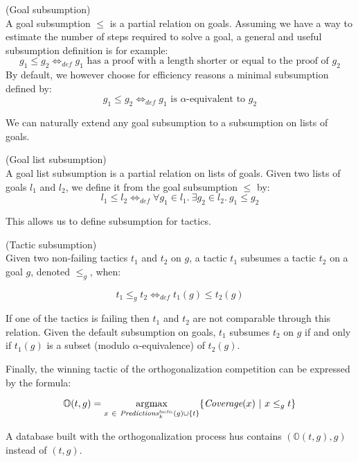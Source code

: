 \documentclass[runningheads,a4paper,draft]{svjour3}
\DeclareMathOperator*{\argmax}{\arg\!\max}
\begin{document}
\begin{definition} (Goal subsumption)\\
A goal subsumption $\le$ is a partial relation on goals.
Assuming we have a way to estimate the number of steps required to solve a goal,
a %
general and useful subsumption definition is for example:
\[g_1 \le g_2  \Leftrightarrow_{def} g_1 \mbox{ has a proof with a length
shorter
or equal to the proof of }
g_2\]
By default, we however choose for efficiency reasons a minimal subsumption defined by:
\[g_1 \le g_2  \Leftrightarrow_{def} g_1 \mbox{ is }\alpha\mbox{-equivalent
to } g_2\]
\end{definition}

We can naturally extend any goal subsumption to a subsumption on
lists of goals.
\begin{definition} (Goal list subsumption)\\
A goal list subsumption is a partial relation on lists of goals.
Given two lists of goals $l_1$ and $l_2$, we define it from the goal
subsumption $\le$ by:
\[l_1 \le l_2  \Leftrightarrow_{def} \forall g_1 \in l_1.\ \exists g_2 \in l_2.\
g_1 \le g_2\]
\end{definition}

This allows us to define subsumption for tactics.
\begin{definition}\label{def:tacsub}(Tactic subsumption)\\
Given two non-failing tactics $t_1$ and $t_2$ on $g$, a tactic $t_1$ subsumes a
tactic $t_2$ on a goal $g$, denoted $\le_g$, when:

 \[t_1 \le_g t_2 \Leftrightarrow_{def} t_1(g) \le t_2(g)\]

If one of the tactics is failing then $t_1$ and $t_2$ are not comparable through
this relation.
Given the default subsumption on goals, $t_1$ subsumes $t_2$ on $g$ if and only
if $t_1(g)$ is a subset (modulo $\alpha$-equivalence) of $t_2(g)$.
\end{definition}

Finally, the winning tactic of the orthogonalization competition can be
expressed by the formula:

\[\mathbb{O}(t,g) = \argmax_{x\ \in\
\mathit{Predictions}^{\mathit{tactic}}_k(g) \cup
\lbrace t
\rbrace} \lbrace
\textit{\mbox{Coverage}}(x)\
|\ x \le_g t\rbrace\]

A database built with the orthogonalization process hus contains
$(\mathbb{O}(t,g),g)$ instead of $(t,g)$.
\end{document}
